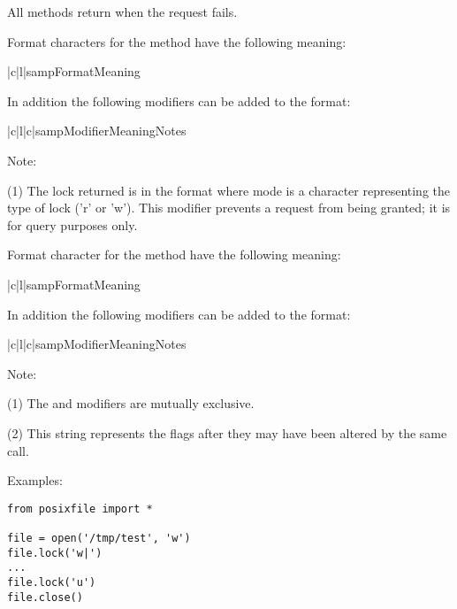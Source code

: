 All methods return  when the request fails.

Format characters for the  method have the following meaning:

\begin{tableii}{|c|l|}{samp}{Format}{Meaning}
\end{tableii}

In addition the following modifiers can be added to the format:

\begin{tableiii}{|c|l|c|}{samp}{Modifier}{Meaning}{Notes}
\end{tableiii}

Note:

(1) The lock returned is in the format  where mode is a character representing the type of lock
('r' or 'w').  This modifier prevents a request from being granted; it
is for query purposes only.

Format character for the  method have the following meaning:

\begin{tableii}{|c|l|}{samp}{Format}{Meaning}
\end{tableii}

In addition the following modifiers can be added to the format:

\begin{tableiii}{|c|l|c|}{samp}{Modifier}{Meaning}{Notes}
\end{tableiii}

Note:

(1) The \code{!} and \code{=} modifiers are mutually exclusive.

(2) This string represents the flags after they may have been altered
by the same call.

Examples:

\bcode\begin{verbatim}
from posixfile import *

file = open('/tmp/test', 'w')
file.lock('w|')
...
file.lock('u')
file.close()
\end{verbatim}\ecode

